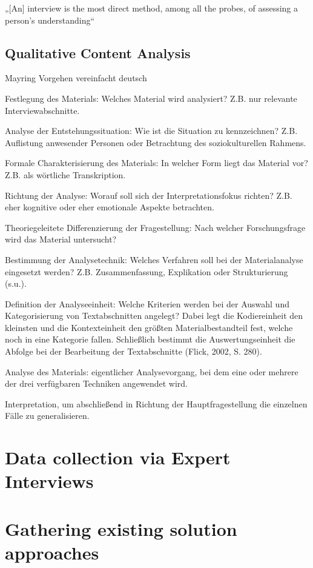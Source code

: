 „[An] interview is the most direct method, among all the probes, of assessing a person’s understanding“ \cite{WhiteProbingunderstanding1992}

\subsection{Qualitative Content Analysis}

Mayring Vorgehen vereinfacht deutsch

Festlegung des Materials: Welches Material wird analysiert? Z.B. nur relevante Interviewabschnitte.

Analyse der Entstehungssituation: Wie ist die Situation zu kenn­zeichnen? Z.B. Auflistung anwesender Personen oder Betrachtung des soziokulturellen Rahmens.

Formale Charakterisierung des Materials: In welcher Form liegt das Material vor? Z.B. als wörtliche Transkription.

Richtung der Analyse: Worauf soll sich der Interpretationsfokus richten? Z.B. eher kognitive oder eher emotionale Aspekte be­trachten.

Theoriegeleitete Differenzierung der Fragestellung: Nach welcher Forschungsfrage wird das Material untersucht?

Bestimmung der Analysetechnik: Welches Verfahren soll bei der Materialanalyse eingesetzt werden? Z.B. Zusammenfassung, Explikation oder Strukturierung (s.u.).

Definition der Analyseeinheit: Welche Kriterien werden bei der Auswahl und Kategorisierung von Textabschnitten angelegt? Dabei legt die Kodiereinheit den kleinsten und die Kontexteinheit den größten Materialbestandteil fest, welche noch in eine Kategorie fallen. Schließlich bestimmt die Auswertungseinheit die Abfolge bei der Bearbeitung der Textabschnitte (Flick, 2002, S. 280).

Analyse des Materials: eigentlicher Analysevorgang, bei dem eine oder mehrere der drei verfügbaren Techniken angewendet wird.

Interpretation, um abschließend in Richtung der Hauptfragestellung die einzelnen Fälle zu generalisieren.

\section{Data collection via Expert Interviews}

\section{Gathering existing solution approaches}